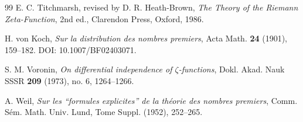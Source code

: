 \documentclass[11pt]{amsart}
\numberwithin{equation}{section}
\begin{document}
\begin{thebibliography}{99}
E. C. Titchmarsh, revised by D. R. Heath-Brown,
\emph{The Theory of the Riemann Zeta-Function}, 2nd ed.,
Clarendon Press, Oxford, 1986.

H. von Koch,
\emph{Sur la distribution des nombres premiers},
Acta Math. \textbf{24} (1901), 159--182.
DOI: 10.1007/BF02403071.

S. M. Voronin,
\emph{On differential independence of $\zeta$-functions},
Dokl. Akad. Nauk SSSR \textbf{209} (1973), no. 6, 1264--1266.

A. Weil,
\emph{Sur les ``formules explicites'' de la th\'eorie des nombres premiers},
Comm. S\'em. Math. Univ. Lund, Tome Suppl. (1952), 252--265.

\end{thebibliography}
\end{document}
